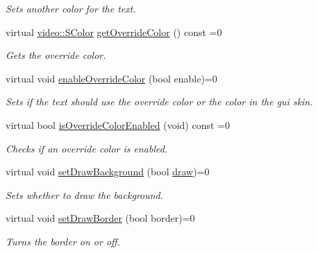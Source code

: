 \begin{DoxyCompactItemize}
\begin{DoxyCompactList}\small\item\em Sets another color for the text. \end{DoxyCompactList}\item 
\mbox{\label{classirr_1_1gui_1_1IGUIEditBox_a2390e7376b017d8f1e2e724be88fbcc3}} 
virtual \hyperlink{classirr_1_1video_1_1SColor}{video\+::\+S\+Color} \hyperlink{classirr_1_1gui_1_1IGUIEditBox_a2390e7376b017d8f1e2e724be88fbcc3}{get\+Override\+Color} () const =0
\begin{DoxyCompactList}\small\item\em Gets the override color. \end{DoxyCompactList}\item 
virtual void \hyperlink{classirr_1_1gui_1_1IGUIEditBox_a121ab76cb2b69bbc4238921095917346}{enable\+Override\+Color} (bool enable)=0
\begin{DoxyCompactList}\small\item\em Sets if the text should use the override color or the color in the gui skin. \end{DoxyCompactList}\item 
virtual bool \hyperlink{classirr_1_1gui_1_1IGUIEditBox_ae62dac299d0101be9d78ed3db9a2d314}{is\+Override\+Color\+Enabled} (void) const =0
\begin{DoxyCompactList}\small\item\em Checks if an override color is enabled. \end{DoxyCompactList}\item 
\mbox{\label{classirr_1_1gui_1_1IGUIEditBox_a06b1913867b10018e891969d319f376f}} 
virtual void \hyperlink{classirr_1_1gui_1_1IGUIEditBox_a06b1913867b10018e891969d319f376f}{set\+Draw\+Background} (bool \hyperlink{classirr_1_1gui_1_1IGUIElement_a1ef7eeaff67b8a9f4f37cacdc7e54be2}{draw})=0
\begin{DoxyCompactList}\small\item\em Sets whether to draw the background. \end{DoxyCompactList}\item 
virtual void \hyperlink{classirr_1_1gui_1_1IGUIEditBox_a37094bd4bc6b82a184bd1d7864f7ea18}{set\+Draw\+Border} (bool border)=0
\begin{DoxyCompactList}\small\item\em Turns the border on or off. \end{DoxyCompactList}\item 

\end{DoxyCompactItemize}
